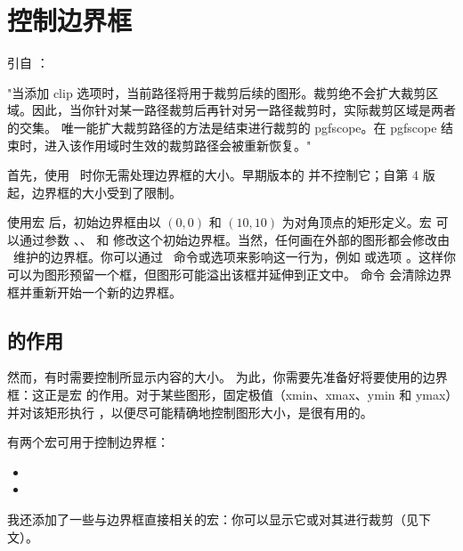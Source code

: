 \section{控制边界框}
引自 ：

"当添加 clip 选项时，当前路径将用于裁剪后续的图形。裁剪绝不会扩大裁剪区域。因此，当你针对某一路径裁剪后再针对另一路径裁剪时，实际裁剪区域是两者的交集。
唯一能扩大裁剪路径的方法是结束进行裁剪的 {pgfscope}。在 {pgfscope} 结束时，进入该作用域时生效的裁剪路径会被重新恢复。"


首先，使用 \TIKZ\ 时你无需处理边界框的大小。早期版本的  并不控制它；自第 4 版起，边界框的大小受到了限制。

使用宏  后，初始边界框由以 $(0,0)$ 和 $(10,10)$ 为对角顶点的矩形定义。宏  可以通过参数 、、 和  修改这个初始边界框。当然，任何画在外部的图形都会修改由 \TIKZ\ 维护的边界框。你可以通过 \TIKZ\ 命令或选项来影响这一行为，例如  或选项 。这样你可以为图形预留一个框，但图形可能溢出该框并延伸到正文中。
命令  会清除边界框并重新开始一个新的边界框。

\subsection{ 的作用}
 然而，有时需要控制所显示内容的大小。
 为此，你需要先准备好将要使用的边界框：这正是宏  的作用。对于某些图形，固定极值（xmin、xmax、ymin 和 ymax）并对该矩形执行 ，以便尽可能精确地控制图形大小，是很有用的。

有两个宏可用于控制边界框：
\begin{itemize}
   \item {}
   \item {}
\end{itemize}
\vspace{20pt}

我还添加了一些与边界框直接相关的宏：你可以显示它或对其进行裁剪（见下文）。

\subsection{}

